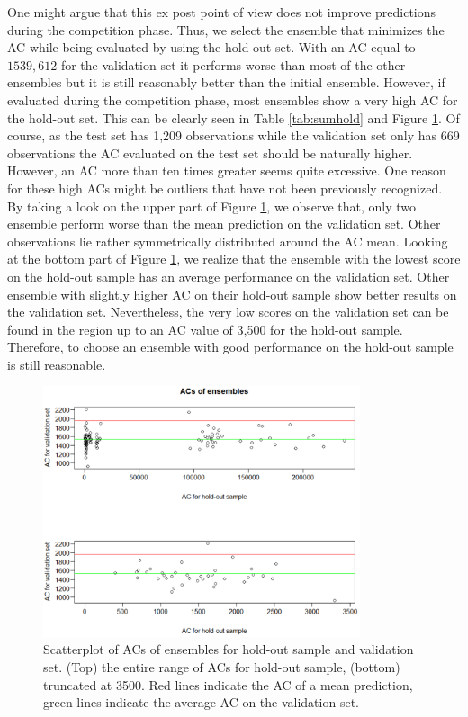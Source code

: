 \documentclass[12pt]{article}
\begin{document}
One might argue that this ex post point of view does not improve predictions during the competition phase. Thus, we select the ensemble that minimizes the AC while being evaluated by using the hold-out set. With an AC equal to $1539,612$ for the validation set it performs worse than most of the other ensembles but it is still reasonably better than the initial ensemble. However, if evaluated during the competition phase, most ensembles show a very high AC for the hold-out set. This can be clearly seen in Table \ref{tab:sumhold} and Figure \ref{tab:acensemble}. Of course, as the test set has 1,209 observations while the validation set only has 669 observations the AC evaluated on the test set should be naturally higher. However, an AC more than ten times greater seems quite excessive. One reason for these high ACs might be outliers that have not been previously recognized. \\

By taking a look on the upper part of Figure \ref{tab:acensemble}, we observe that, only two ensemble perform worse than the mean prediction on the validation set. Other observations lie rather symmetrically distributed around the AC mean. Looking at the bottom part of Figure \ref{tab:acensemble}, we realize that the ensemble with the lowest score on the hold-out sample has an average performance on the validation set. Other ensemble with slightly higher AC on their hold-out sample show better results on the validation set. Nevertheless, the very low scores on the validation set can be found in the region up to an AC value of 3,500 for the hold-out sample. Therefore, to choose an ensemble with good performance on the hold-out sample is still reasonable.
\begin{figure}[H]
	\centering
	\includegraphics[width=0.83\textwidth]{ACensemble.pdf}
	\caption{Scatterplot of ACs of ensembles for hold-out sample and validation set. (Top) the entire range of ACs for hold-out sample, (bottom) truncated at 3500. Red lines indicate the AC of a mean prediction, green lines indicate the average AC on the validation set.}
	\label{tab:acensemble}
\end{figure}
\end{document}
